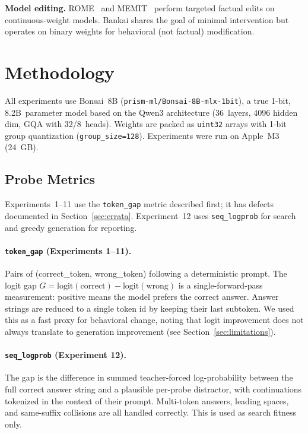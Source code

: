 \documentclass[11pt,a4paper]{article}
\begin{document}
\textbf{Model editing.}
ROME~\citep{meng2022rome} and MEMIT~\citep{meng2023memit} perform
targeted factual edits on continuous-weight models. Bankai shares
the goal of minimal intervention but operates on binary weights for
behavioral (not factual) modification.

\section{Methodology}

All experiments use Bonsai~8B (\texttt{prism-ml/Bonsai-8B-mlx-1bit}),
a true 1-bit, 8.2B~parameter model based on the Qwen3 architecture
(36~layers, 4096 hidden dim, GQA with 32/8~heads). Weights are packed
as \texttt{uint32} arrays with 1-bit group quantization
(\texttt{group\_size=128}). Experiments were run on Apple~M3 (24~GB).

\subsection{Probe Metrics}

Experiments~1--11 use the \texttt{token\_gap} metric described first; it has
defects documented in Section~\ref{sec:errata}. Experiment~12 uses
\texttt{seq\_logprob} for search and greedy generation for reporting.

\paragraph{\texttt{token\_gap} (Experiments 1--11).}
Pairs of (correct\_token, wrong\_token) following a deterministic prompt. The
logit gap $G = \text{logit}(\text{correct}) - \text{logit}(\text{wrong})$
is a single-forward-pass measurement: positive means the model prefers
the correct answer. Answer strings are reduced to a single token id by keeping
their last subtoken. We used this as a fast proxy for behavioral change,
noting that logit improvement does not always translate to generation
improvement (see Section~\ref{sec:limitations}).

\paragraph{\texttt{seq\_logprob} (Experiment 12).}
The gap is the difference in summed teacher-forced log-probability between the
full correct answer string and a plausible per-probe distractor, with
continuations tokenized in the context of their prompt. Multi-token answers,
leading spaces, and same-suffix collisions are all handled correctly. This is
used as search fitness only.
\end{document}
